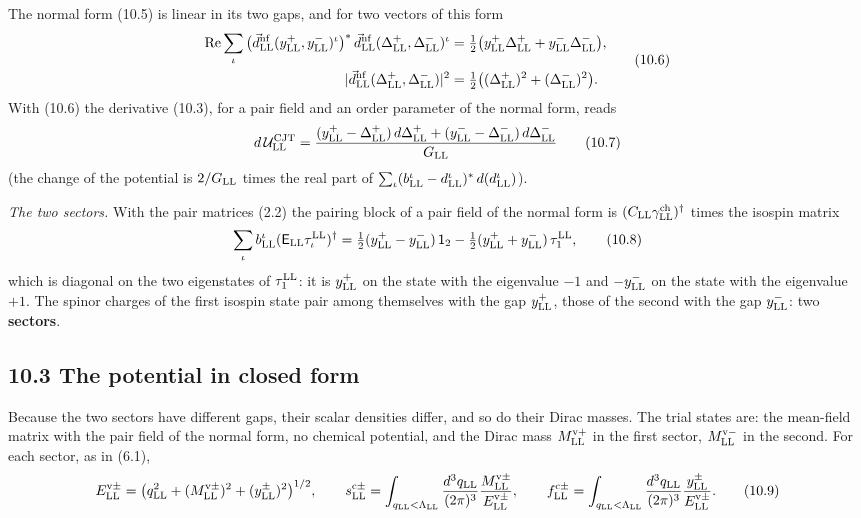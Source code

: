 \documentclass[
  10pt,
]{article}
\begin{document}
The normal form (10.5) is linear in its two gaps, and for two vectors of
this form
\[\begin{aligned}\mathrm{Re}\sum_\iota\big(\vec d^{\rm nf}_{\rm LL}(y^+_{\rm LL},y^-_{\rm LL})^\iota\big)^*\,\vec d^{\rm nf}_{\rm LL}(\Delta^+_{\rm LL},\Delta^-_{\rm LL})^\iota&=\tfrac12\big(y^+_{\rm LL}\Delta^+_{\rm LL}+y^-_{\rm LL}\Delta^-_{\rm LL}\big),\\
\lvert\vec d^{\rm nf}_{\rm LL}(\Delta^+_{\rm LL},\Delta^-_{\rm LL})\rvert^2&=\tfrac12\big((\Delta^+_{\rm LL})^2+(\Delta^-_{\rm LL})^2\big).\end{aligned}\tag{10.6}\]
With (10.6) the derivative (10.3), for a pair field and an order
parameter of the normal form, reads
\[d\,\mathcal U^{\rm CJT}_{\rm LL}=\frac{(y^+_{\rm LL}-\Delta^+_{\rm LL})\,d\Delta^+_{\rm LL}+(y^-_{\rm LL}-\Delta^-_{\rm LL})\,d\Delta^-_{\rm LL}}{G_{\rm LL}}\tag{10.7}\]
(the change of the potential is \(2/G_{\rm LL}\) times the real part of
\(\sum_\iota(b^\iota_{\rm LL}-d^\iota_{\rm LL})^*\,d(d^\iota_{\rm LL})\)).

\emph{The two sectors.} With the pair matrices (2.2) the pairing block
of a pair field of the normal form is
\((C_{\rm LL}\gamma^{\rm ch}_{\rm LL})^\dagger\) times the isospin
matrix
\[\sum_\iota b^\iota_{\rm LL}(\mathsf E_{\rm LL}\tau^{\rm LL}_\iota)^\dagger=\tfrac12(y^+_{\rm LL}-y^-_{\rm LL})\,\mathsf 1_2-\tfrac12(y^+_{\rm LL}+y^-_{\rm LL})\,\tau^{\rm LL}_1,\tag{10.8}\]
which is diagonal on the two eigenstates of \(\tau^{\rm LL}_1\): it is
\(y^+_{\rm LL}\) on the state with the eigenvalue \(-1\) and
\(-y^-_{\rm LL}\) on the state with the eigenvalue \(+1\). The spinor
charges of the first isospin state pair among themselves with the gap
\(y^+_{\rm LL}\), those of the second with the gap \(y^-_{\rm LL}\): two
\textbf{sectors}.

\hypertarget{the-potential-in-closed-form}{%
\subsection{10.3 The potential in closed
form}\label{the-potential-in-closed-form}}

Because the two sectors have different gaps, their scalar densities
differ, and so do their Dirac masses. The trial states are: the
mean-field matrix with the pair field of the normal form, no chemical
potential, and the Dirac mass \(M^{{\rm v}+}_{\rm LL}\) in the first
sector, \(M^{{\rm v}-}_{\rm LL}\) in the second. For each sector, as in
(6.1),
\[E^{{\rm v}\pm}_{\rm LL}=\big(q_{\rm LL}^2+(M^{{\rm v}\pm}_{\rm LL})^2+(y^\pm_{\rm LL})^2\big)^{1/2},\qquad
s^{{\rm c}\pm}_{\rm LL}=\int_{q_{\rm LL}<\Lambda_{\rm LL}}\frac{d^3q_{\rm LL}}{(2\pi)^3}\frac{M^{{\rm v}\pm}_{\rm LL}}{E^{{\rm v}\pm}_{\rm LL}},\qquad
f^{{\rm c}\pm}_{\rm LL}=\int_{q_{\rm LL}<\Lambda_{\rm LL}}\frac{d^3q_{\rm LL}}{(2\pi)^3}\frac{y^\pm_{\rm LL}}{E^{{\rm v}\pm}_{\rm LL}}.\tag{10.9}\]
\end{document}
